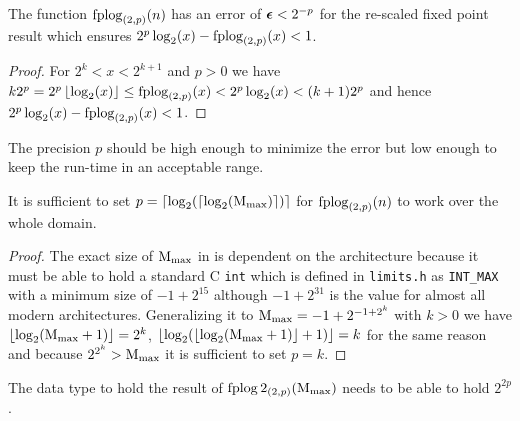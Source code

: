 \begin{lem}\label{lem:fperror}
The function $\operatorname{fplog}_{(2,p)}(n)$ has an error of $\boldsymbol{\epsilon} < 2^{-p}$ \citep{majithia1973note}
for the re-scaled fixed point result which ensures $2^p\log_2(x) - \operatorname{fplog}_{(2,p)}(x) < 1$.
\end{lem}
\begin{proof}
For $2^k < x < 2^{k+1}$ and $p > 0$ we have 
$k2^p = 2^p\left\lfloor\log_2(x)\right\rfloor \le \operatorname{fplog}_{(2,p)}(x) < 2^p\log_2(x) < (k+1)2^p$
and hence $2^p\log_2(x) - \operatorname{fplog}_{(2,p)}(x) < 1$.
\end{proof}
The precision $p$ should be high enough to minimize the error but low enough to keep the
run-time in an acceptable range.
\begin{lem}\label{lem:fplog2sizeofp}
It is sufficient to set $p = \left\lceil\log_2 (\left\lceil\log_2 (\textrm{M}_{\textrm{max}})\right\rceil)\right\rceil$ for $\operatorname{fplog}_{(2,p)}(n)$ to work
over the whole domain.
\end{lem}
\begin{proof}
The exact size of $\textrm{M}_{\textrm{max}}$ in \libtommath{} is dependent on the architecture because it
must be able to hold a standard C \texttt{int} which is defined \citep{9899:2018} in \texttt{limits.h}
as \texttt{INT\_MAX} with a minimum size of $-1 + 2^{15}$ although $-1 + 2^{31}$ is the value for almost
all modern architectures. Generalizing it to $\textrm{M}_{\textrm{max}} = -1 + 2^{-1 + 2^k}$ with $k>0$ we have 
$\left\lfloor\log_2(\textrm{M}_{\textrm{max}}+1)\right\rfloor = 2^k$, $\left\lfloor\log_2(\left\lfloor\log_2(\textrm{M}_{\textrm{max}}+1)\right\rfloor +1)\right\rfloor = k$
for the same reason and because $2^{2^k} > \textrm{M}_{\textrm{max}}$ it is sufficient to set $p=k$.
\end{proof}
\begin{note}\label{note:sizeofresult2p}
The data type to hold the result of $\operatorname{fplog}2_{(2,p)}(\textrm{M}_{\textrm{max}})$ needs to be able to
hold $2^{2p}$.
\end{note}



